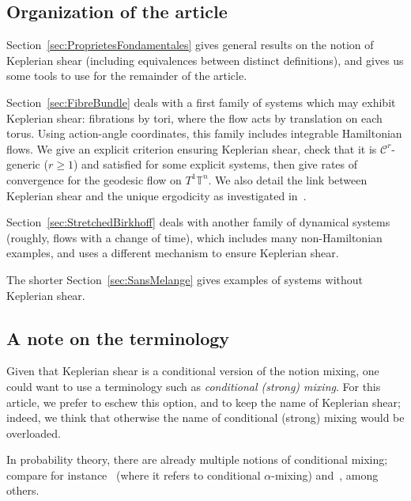 \documentclass[10pt]{amsart}
\theoremstyle{definition}\newtheorem{defi}[theo]{Definition}\newtheorem{rema}[theo]{Remark}\newtheorem{exam}[theo]{Example}\newtheorem{exem}[theo]{Example}\newtheorem{nota}[theo]{Notation}
\newcommand{\Tbb}{\mathbb{T}}
\newcommand{\Ccal}{\mathcal{C}}
\begin{document}
\subsection{Organization of the article}

Section~\ref{sec:ProprietesFondamentales} gives general results on the notion of Keplerian shear (including equivalences between distinct definitions), and gives us some tools to use for the remainder of the article.


Section~\ref{sec:FibreBundle} deals with a first family of systems which may exhibit Keplerian shear: fibrations by tori, where the flow acts by translation on each torus. Using action-angle coordinates, this family includes integrable Hamiltonian flows. We give an explicit criterion ensuring Keplerian shear, check that it is $\Ccal^r$-generic ($r \geq 1$) and satisfied for some explicit systems, then give rates of convergence for the geodesic flow on $T^1 \Tbb^n$. We also detail the link between Keplerian shear and the unique ergodicity as investigated in~\cite{Maucourant:2016}.


Section~\ref{sec:StretchedBirkhoff} deals with another family of dynamical systems (roughly, flows with a change of time), which includes many non-Hamiltonian examples, and uses a different mechanism to ensure Keplerian shear.


The shorter Section~\ref{sec:SansMelange} gives examples of systems without Keplerian shear.


\subsection{A note on the terminology}

Given that Keplerian shear is a conditional version of the notion mixing, one could want to use a terminology such as \emph{conditional (strong) mixing}. For this article, we prefer to eschew this option, and to keep the name of Keplerian shear; indeed, we think that otherwise the name of conditional (strong) mixing would be overloaded.


In probability theory, there are already multiple notions of conditional mixing; compare for instance~\cite{Rao:2009} (where it refers to conditional $\alpha$-mixing) and~\cite{KacemLoiselMaumeDeschamps:2016}, among others.
\end{document}
